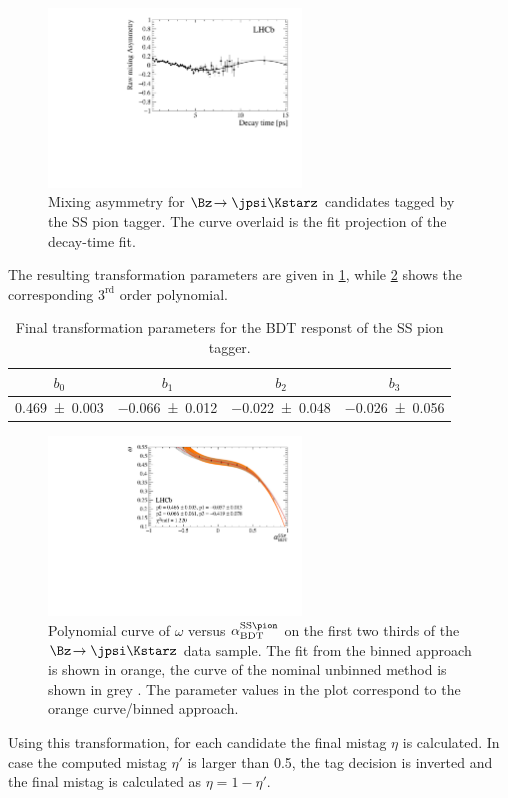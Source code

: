 \begin{figure}[tbp]
	\begin{center}
		\includegraphics[width=0.6\textwidth]{09FlavourTagging/figs/Asymmetry_SSPion.pdf}
	\end{center}
	\caption{Mixing asymmetry for $\Bz\!\to\jpsi\Kstarz$ candidates tagged by the SS pion tagger.
	The curve overlaid is the fit projection of the decay-time fit.}
	\label{fig:MixingSSPion}
\end{figure}
The resulting transformation parameters are given in \cref{tab:transformationSSPion}, while \cref{fig:transformationSSPion} shows the corresponding $3^{\text{rd}}$ order polynomial.
\begin{table}[tbp]
	\centering
	\caption{Final transformation parameters for the BDT responst of the SS pion tagger.}
	\begin{tabular}{cccc}
		\toprule
		$b_0$ & $b_1$ & $b_2$ & $b_3$ \\
		\midrule
		\num{0.469\pm0.003} & \num{-0.066\pm0.012} & \num{-0.022\pm0.048} & \num{-0.026\pm0.056} \\
		\bottomrule
	\end{tabular}
	\label{tab:transformationSSPion}
\end{table}
\begin{figure}[tbp]
	\begin{center}
		\includegraphics[width=0.6\textwidth]{09FlavourTagging/figs/SSPionBDTTrafo.pdf}
	\end{center}
	\caption{Polynomial curve of $\omega$ versus $\alpha^{\text{SS}\pion}_\text{BDT}$ on the first two thirds of the $\Bz\!\to\jpsi\Kstarz$ data sample.
	The fit from the binned approach is shown in orange, the curve of the nominal unbinned method is shown in grey .
	The parameter values in the plot correspond to the orange curve/binned approach.}
	\label{fig:transformationSSPion}
\end{figure}
Using this transformation, for each \Bz candidate the final mistag $\eta$ is calculated.
In case the computed mistag $\eta'$ is larger than \num{0.5}, the tag decision is inverted and the final mistag is calculated as $\eta=1-\eta'$.

